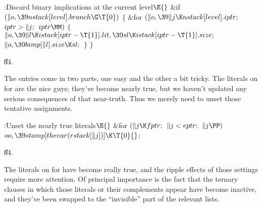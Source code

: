 \Y\B\4:Discard binary implications at the current level\X${}\E{}$\6
\&{if} ${}(\|o,\39\\{nstack}[\\{level}].\\{branch}\G\T{0}){}$\5
${}\{{}$\1\6
\&{for} ${}(\|o,\39\|j\K\\{nstack}[\\{level}].\\{iptr};{}$ ${}\\{iptr}>\|j;{}$
${}\\{iptr}\MM){}$\5
${}\{{}$\1\6
${}\|o,\39\|l\K\\{istack}[\\{iptr}-\T{1}].\\{lit},\39\\{sl}\K\\{istack}[%
\\{iptr}-\T{1}].\\{size};{}$\6
${}\|o,\39\\{bimp}[\|l].\\{size}\K\\{sl};{}$\6
\4${}\}{}$\2\6
\4${}\}{}$\2\par
\U84.\fi

The  entries come in two parts, one easy and the other
a bit tricky. The literals on  for
 are the nice guys; they've become nearly true,
but we haven't
updated any serious consequences of that near-truth. Thus we merely need to
unset those tentative assignments.

\Y\B\4:Unset the nearly true literals\X${}\E{}$\6
\&{for} ${}(\|j\K\\{fptr};{}$ ${}\|j<\\{eptr};{}$ ${}\|j\PP){}$\1\5
${}\\{oo},\39\\{stamp}[\\{thevar}(\\{rstack}[\|j])]\K\T{0}{}$;\2\par
\U84.\fi

The literals on  for 
have become really true,
and the ripple effects of those settings require more attention.
Of principal importance is the fact that the ternary clauses in which
those literals or their complements appear have become inactive,
and they've been swapped to the ``invisible'' part of the relevant
 lists.

